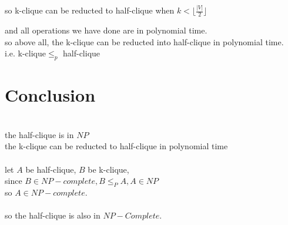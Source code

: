 \begin{parts}
\begin{solution}
\begin{itemize}
			so k-clique can be reducted to half-clique when $k<\lfloor\frac{|V|}{2}\rfloor$\\
		\end{itemize}
		
		and all operations we have done are in polynomial time.\\
		so above all, the k-clique can be reducted into half-clique in polynomial time.\\
		i.e. k-clique$\leq _p$ half-clique\\
	\end{solution}
	
	\part[1]{Conclusion}
	\begin{solution}
		\\the half-clique is in $NP$\\
		the k-clique can be reducted to half-clique in polynomial time\\\\
		let $A$ be half-clique, $B$ be k-clique,\\
		since $B\in NP-complete, B\leq _PA, A\in NP$\\
		so $A\in NP-complete$.\\\\
		so the half-clique is also in $NP-Complete$.\\
	\end{solution}
\end{parts}
